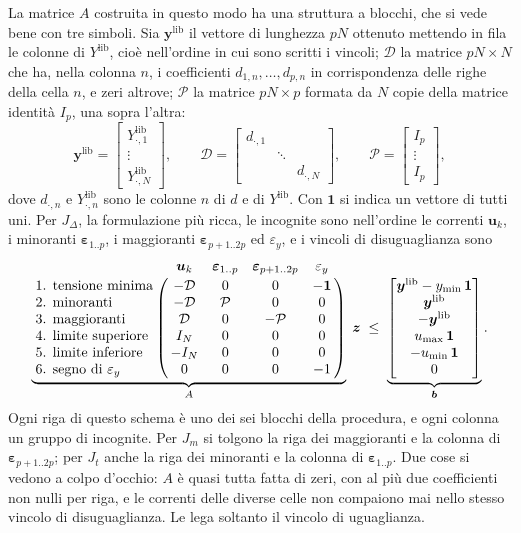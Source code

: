 \documentclass[11pt,a4paper]{article}
\newcommand{\Dc}{\mathcal{D}}
\newcommand{\Pc}{\mathcal{P}}
\newcommand{\uno}{\mathbf{1}}
\newcommand{\vett}[1]{\boldsymbol{#1}}      %
\newcommand{\lib}{\mathrm{lib}}             %
\begin{document}
La matrice $A$ costruita in questo modo ha una struttura a blocchi, che si
vede bene con tre simboli. Sia $\vett{y}^\lib$ il vettore di lunghezza $pN$ ottenuto
mettendo in fila le colonne di $Y^\lib$, cioè nell'ordine in cui sono scritti i
vincoli; $\Dc$ la matrice $pN \times N$ che ha, nella colonna $n$, i
coefficienti $d_{1,n}, \dots, d_{p,n}$ in corrispondenza delle righe della
cella $n$, e zeri altrove; $\Pc$ la matrice $pN \times p$ formata da $N$ copie
della matrice identità $I_p$, una sopra l'altra:
\[
  \vett{y}^\lib = \begin{bmatrix} Y^\lib_{\cdot,1} \\ \vdots \\ Y^\lib_{\cdot,N} \end{bmatrix},
  \qquad
  \Dc = \begin{bmatrix}
          d_{\cdot,1} & & \\
          & \ddots & \\
          & & d_{\cdot,N}
        \end{bmatrix},
  \qquad
  \Pc = \begin{bmatrix} I_p \\ \vdots \\ I_p \end{bmatrix},
\]
dove $d_{\cdot,n}$ e $Y^\lib_{\cdot,n}$ sono le colonne $n$ di $d$ e di $Y^\lib$.
Con $\uno$ si indica un vettore di tutti uni. Per $J_\Delta$, la formulazione
più ricca, le incognite sono nell'ordine le correnti $\vett{u}_k$, i minoranti
$\vett{\varepsilon}_{1..p}$, i maggioranti $\vett{\varepsilon}_{p+1..2p}$ ed $\varepsilon_y$, e i vincoli
di disuguaglianza sono
\[
  \underbrace{
  \bordermatrix{
      & \vett{u}_k & \vett{\varepsilon}_{1..p} & \vett{\varepsilon}_{p+1..2p} & \varepsilon_y \cr
    \text{1. tensione minima} & -\Dc & 0 & 0 & -\uno \cr
    \text{2. minoranti}       & -\Dc & \Pc & 0 & 0 \cr
    \text{3. maggioranti}     & \Dc & 0 & -\Pc & 0 \cr
    \text{4. limite superiore} & I_N & 0 & 0 & 0 \cr
    \text{5. limite inferiore} & -I_N & 0 & 0 & 0 \cr
    \text{6. segno di } \varepsilon_y     & 0 & 0 & 0 & -1 \cr
  }}_{A}
  \; \vett{z} \;\le\;
  \underbrace{
  \begin{bmatrix}
    \vett{y}^\lib - y_{\min}\,\uno \\ \vett{y}^\lib \\ -\vett{y}^\lib \\ u_{\max}\,\uno \\ -u_{\min}\,\uno \\ 0
  \end{bmatrix}}_{\vett{b}} .
\]
Ogni riga di questo schema è uno dei sei blocchi della procedura, e ogni
colonna un gruppo di incognite. Per $J_m$ si tolgono la riga dei maggioranti e
la colonna di $\vett{\varepsilon}_{p+1..2p}$; per $J_t$ anche la riga dei minoranti e
la colonna di $\vett{\varepsilon}_{1..p}$. Due cose si vedono a colpo d'occhio: $A$ è
quasi tutta fatta di zeri, con al più due coefficienti non nulli per riga, e
le correnti delle diverse celle non compaiono mai nello stesso vincolo di
disuguaglianza. Le lega soltanto il vincolo di uguaglianza.
\end{document}
